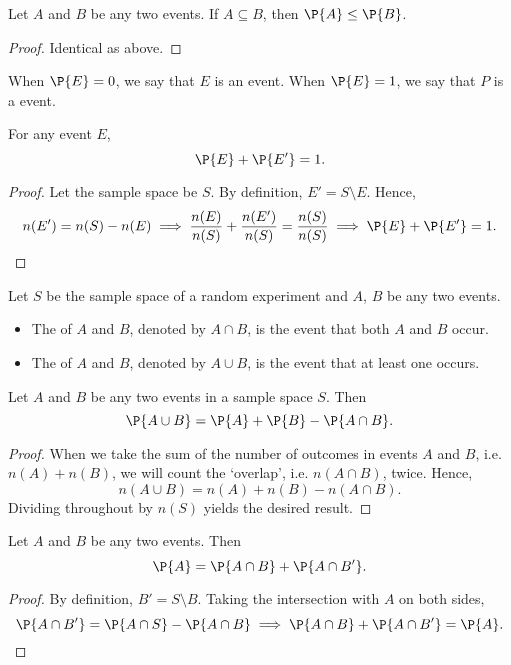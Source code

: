 \begin{corollary}
    Let $A$ and $B$ be any two events. If $A \subseteq B$, then $\P{A} \leq \P{B}$.
\end{corollary}
\begin{proof}
    Identical as above.
\end{proof}

\begin{definition}
    When $\P{E} = 0$, we say that $E$ is an  event. When $\P{E} = 1$, we say that $P$ is a  event.
\end{definition}

\begin{proposition}
    For any event $E$, \[\P{E} + \P{E'} = 1.\]
\end{proposition}
\begin{proof}
    Let the sample space be $S$. By definition, $E' = S \setminus E$. Hence, \[n(E') = n(S) - n(E) \implies \frac{n(E)}{n(S)} + \frac{n(E')}{n(S)} = \frac{n(S)}{n(S)} \implies \P{E} + \P{E'} = 1.\]
\end{proof}

\begin{definition}
    Let $S$ be the sample space of a random experiment and $A$, $B$ be any two events.
    \begin{itemize}
        \item The  of $A$ and $B$, denoted by $A \cap B$, is the event that both $A$ and $B$ occur.
        \item The  of $A$ and $B$, denoted by $A \cup B$, is the event that at least one occurs.
    \end{itemize}
\end{definition}

\begin{proposition}
    Let $A$ and $B$ be any two events in a sample space $S$. Then \[\P{A \cup B} = \P{A} + \P{B} - \P{A \cap B}.\]
\end{proposition}
\begin{proof}
    When we take the sum of the number of outcomes in events $A$ and $B$, i.e. $n(A) + n(B)$, we will count the `overlap', i.e. $n(A \cap B)$, twice. Hence, \[n(A \cup B) = n(A) + n(B) - n(A \cap B).\] Dividing throughout by $n(S)$ yields the desired result.
\end{proof}

\begin{proposition}
    Let $A$ and $B$ be any two events. Then \[\P{A} = \P{A \cap B} + \P{A \cap B'}.\]
\end{proposition}
\begin{proof}
    By definition, $B' = S \setminus B$. Taking the intersection with $A$ on both sides, \[\P{A \cap B'} = \P{A \cap S} - \P{A \cap B} \implies \P{A \cap B} + \P{A \cap B'} = \P{A}.\]
\end{proof}


